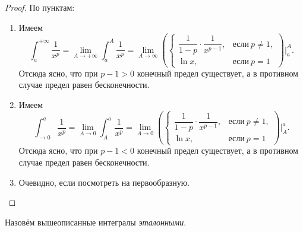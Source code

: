 \begin{proof}
	По пунктам:
	\begin{enumerate}
		\item Имеем \[
			\int_a^{+\infty} \frac{1}{x^p} = \lim_{A \to +\infty} \int_a^A \frac{1}{x^p} = \lim_{A 	\to \infty} \left(
			\begin{cases}
				\dfrac{1}{1 - p} \cdot \dfrac{1}{x^{p - 1}}, &\text{если} \ p \neq 1, \\
				\ln x, 									   &\text{если} \ p = 1
			\end{cases}
			\right) \bigg|_a^A.
		\]
		Отсюда ясно, что при \(p - 1 > 0\) конечный предел существует, а в противном случае предел равен бесконечности.
		\item Имеем \[
			\int_{\to 0}^a \frac{1}{x^p} = \lim_{A \to 0} \int_A^a \frac{1}{x^p} = \lim_{A 	\to 0} \left(
			\begin{cases}
				\dfrac{1}{1 - p} \cdot \dfrac{1}{x^{p - 1}}, &\text{если} \ p \neq 1, \\
				\ln x, 									   &\text{если} \ p = 1
			\end{cases}
			\right) \bigg|_A^a.
		\]
		Отсюда ясно, что при \(p - 1 < 0\) конечный предел существует, а в противном случае предел равен бесконечности.
		\item Очевидно, если посмотреть на первообразную.
	\end{enumerate}
	
\end{proof}

\begin{remark}
	Назовём вышеописанные интегралы \textit{эталонными}.
\end{remark}

